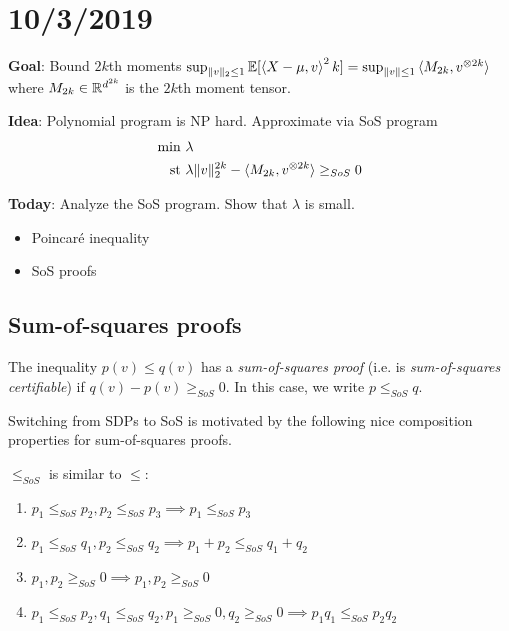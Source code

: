 \section{10/3/2019}

\textbf{Goal}: Bound $2k$th moments $\sup_{\|v\|_2 \leq 1} \mathbb{E}[\braket{X - \mu, v}^2k] = \sup_{\|v\| \leq 1} \braket{M_{2k}, v^{\otimes 2k}}$ where $M_{2k} \in \mathbb{R}^{d^{2k}}$ is the $2k$th moment tensor.

\textbf{Idea}: Polynomial program is NP hard. Approximate via SoS program
\begin{align}
  \min~& \lambda \\
  \text{st}~& \lambda \|v\|_2^{2k} - \braket{M_{2k}, v^{\otimes 2k}} \geq_{SoS} 0
\end{align}

\textbf{Today}: Analyze the SoS program. Show that $\lambda$ is small.
\begin{itemize}
  \item Poincar\'e inequality
  \item SoS proofs
\end{itemize}

\subsection{Sum-of-squares proofs}%

\begin{definition}
  The inequality $p(v) \leq q(v)$ has a \emph{sum-of-squares proof}
  (i.e. is \emph{sum-of-squares certifiable}) if $q(v) - p(v) \geq_{SoS} 0$.
  In this case, we write $p \leq_{SoS} q$.
\end{definition}

Switching from SDPs to SoS is motivated by the following nice composition
properties for sum-of-squares proofs.

\begin{proposition}
  $\leq_{SoS}$ is similar to $\leq$:
  \begin{enumerate}
    \item $p_1 \leq_{SoS} p_2, p_2 \leq_{SoS} p_3 \implies p_1 \leq_{SoS} p_3$
    \item $p_1 \leq_{SoS} q_1, p_2 \leq_{SoS} q_2 \implies p_1 + p_2 \leq_{SoS} q_1 + q_2$
    \item $p_1, p_2 \geq_{SoS} 0 \implies p_1, p_2 \geq_{SoS} 0$
    \item $p_1 \leq_{SoS} p_2, q_1 \leq_{SoS} q_2, p_1 \geq_{SoS} 0, q_2 \geq_{SoS} 0 \implies p_1 q_1 \leq_{SoS} p_2 q_2$
  \end{enumerate}
\end{proposition}

